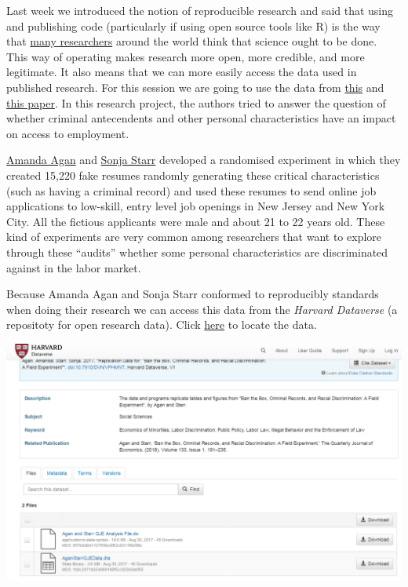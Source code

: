 \documentclass[]{book}
\theoremstyle{definition}
\theoremstyle{definition}
\theoremstyle{definition}
\theoremstyle{remark}
\begin{document}
Last week we introduced the notion of reproducible research and said
that using and publishing code (particularly if using open source tools
like R) is the way that
\href{https://osf.io/?gclid=EAIaIQobChMIq-jM6MuY2QIV7Z3tCh04vAycEAAYASAAEgLptPD_BwE}{many
researchers} around the world think that science ought to be done. This
way of operating makes research more open, more credible, and more
legitimate. It also means that we can more easily access the data used
in published research. For this session we are going to use the data
from \href{https://academic.oup.com/qje/article/133/1/191/4060073}{this}
and
\href{https://pubs.aeaweb.org/doi/pdfplus/10.1257/aer.p20171003}{this
paper}. In this research project, the authors tried to answer the
question of whether criminal antecendents and other personal
characteristics have an impact on access to employment.

\href{http://economics.rutgers.edu/people/626-amanda-agan}{Amanda Agan}
and
\href{https://www.law.umich.edu/FacultyBio/Pages/FacultyBio.aspx?FacID=sbstarr}{Sonja
Starr} developed a randomised experiment in which they created 15,220
fake resumes randomly generating these critical characteristics (such as
having a criminal record) and used these resumes to send online job
applications to low-skill, entry level job openings in New Jersey and
New York City. All the fictious applicants were male and about 21 to 22
years old. These kind of experiments are very common among researchers
that want to explore through these ``audits'' whether some personal
characteristics are discriminated against in the labor market.

Because Amanda Agan and Sonja Starr conformed to reproducibly standards
when doing their research we can access this data from the \emph{Harvard
Dataverse} (a repositoty for open research data). Click
\href{https://dataverse.harvard.edu/dataset.xhtml?persistentId=doi:10.7910/DVN/VPHMNT}{here}
to locate the data.

\includegraphics{imgs/harvarddataverse.PNG}
\end{document}
